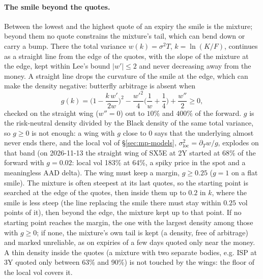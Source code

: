 \paragraph{The smile beyond the quotes.} Between the lowest and the highest quote of an expiry the smile is the
mixture; beyond them no quote constrains the mixture's tail, which can bend down or carry a bump. There the total
variance $w(k) = \sigma^2 T$, $k = \ln(K/F)$, continues as a straight line from the edge of the quotes, with the
slope of the mixture at the edge, kept within Lee's bound $|w'| \le 2$ \citep{lee2004} and never decreasing away from
the money. A straight line drops the curvature of the smile at the edge, which can make the density negative:
butterfly arbitrage is absent when \citep{gatheral2006}
\[
  g(k) = \Big(1 - \frac{k\,w'}{2w}\Big)^2 - \frac{w'^2}{4}\Big(\frac1w + \frac14\Big) + \frac{w''}{2} \ge 0,
\]
checked on the straight wing ($w'' = 0$) out to $10\%$ and $400\%$ of the forward. $g$ is the risk-neutral density
divided by the Black density of the same total variance, so $g \ge 0$ is not enough: a wing with $g$ close to $0$ says
that the underlying almost never ends there, and the local vol of \S\ref{sec:mp-models}, $\sigma^2_{\mathrm{loc}} =
\partial_T w / g$, explodes on that band (on 2026-11-13 the straight wing of SX5E at 2Y started at 68\% of the forward
with $g = 0.02$: local vol 183\% at 64\%, a spiky price in the spot and a meaningless AAD delta). The wing must keep a
margin, $g \ge 0.25$ ($g = 1$ on a flat smile). The mixture is often steepest at its last quotes, so the starting
point is searched at the edge of the quotes, then inside them up to $0.2$ in $k$, where the smile is less steep (the
line replacing the smile there must stay within $0.25$ vol points of it), then beyond the edge, the mixture kept up to
that point. If no starting point reaches the margin, the one with the largest density among those with $g \ge 0$; if
none, the mixture's own tail is kept (a density, free of arbitrage) and marked unreliable, as on expiries of a few
days quoted only near the money. A thin density inside the quotes (a mixture with two separate bodies, e.g. ISP at
3Y quoted only between 63\% and 90\%) is not touched by the wings: the floor of the local vol covers it.

